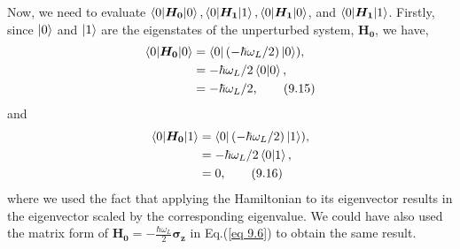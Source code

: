 \documentclass{article}
\begin{document}
Now, we need to evaluate $\braket{0|\boldsymbol{H_0}|0}, \braket{0|\boldsymbol{H_1}|1}, \braket{0|\boldsymbol{H_1}|0}$,
 and $\braket{0|\boldsymbol{H_1}|1}$. Firstly, since $\ket{0}$ and $\ket{1}$ are the eigenstates of the unperturbed system, 
 $\boldsymbol{H_0}$, we have,
\begin{align*}\label{eq 9.15}
    \braket{0|\boldsymbol{H_0}|0}&=\bra{0}(-\hbar\omega_L/2)\ket{0}),\\
    &=-\hbar\omega_L/2\braket{0|0},\\
    &=-\hbar\omega_L/2,\tag{9.15}
\end{align*}
and
\begin{align*}\label{eq 9.16}
    \braket{0|\boldsymbol{H_0}|1}&=\bra{0}(-\hbar\omega_L/2)\ket{1}),\\
    &=-\hbar\omega_L/2\braket{0|1},\\
    &=0,\tag{9.16}
\end{align*}
where we used the fact that applying the Hamiltonian to its eigenvector results in the eigenvector
scaled by the corresponding eigenvalue. We could have also used the matrix form
of $\boldsymbol{H_0}=-\frac{\hbar\omega_L}{2}\boldsymbol{\sigma_z}$ in Eq.(\ref{eq 9.6}) to obtain
the same result.
\end{document}
